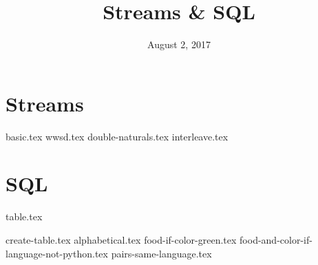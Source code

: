 \documentclass{exam}
\title{Streams \& SQL}
\date{August 2, 2017}
\begin{document}
\maketitle

\section{Streams}
\begin{questions}
{basic.tex}
{wwsd.tex}
{double-naturals.tex}
{interleave.tex}
\end{questions}

\lstset{language=SQL}
\section{SQL}
{table.tex}
\begin{questions}
{create-table.tex}
{alphabetical.tex}
{food-if-color-green.tex}
{food-and-color-if-language-not-python.tex}
{pairs-same-language.tex}
\end{questions}
\end{document}
